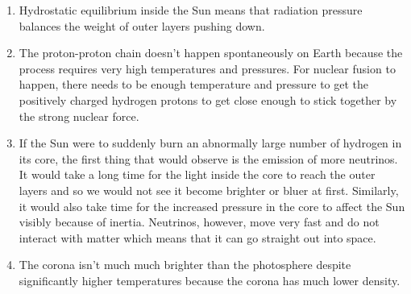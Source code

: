 \documentclass[../hw2.tex]{subfiles}
\begin{document}
    \begin{enumerate}
        \item {} Hydrostatic equilibrium inside the Sun means that radiation pressure balances the weight of outer layers pushing down.
        \item {} The proton-proton chain doesn't happen spontaneously on Earth because the process requires very high temperatures and pressures. For nuclear fusion to happen, there needs to be enough temperature and pressure to get the positively charged hydrogen protons to get close enough to stick together by the strong nuclear force.
        \item {} If the Sun were to suddenly burn an abnormally large number of hydrogen in its core, the first thing that would observe is the emission of more neutrinos. It would take a long time for the light inside the core to reach the outer layers and so we would not see it become brighter or bluer at first. Similarly, it would also take time for the increased pressure in the core to affect the Sun visibly because of inertia. Neutrinos, however, move very fast and do not interact with matter which means that it can go straight out into space.
        \item {} The corona isn't much much brighter than the photosphere despite significantly higher temperatures because the corona has much lower density. %
    \end{enumerate}
    
\end{document}
